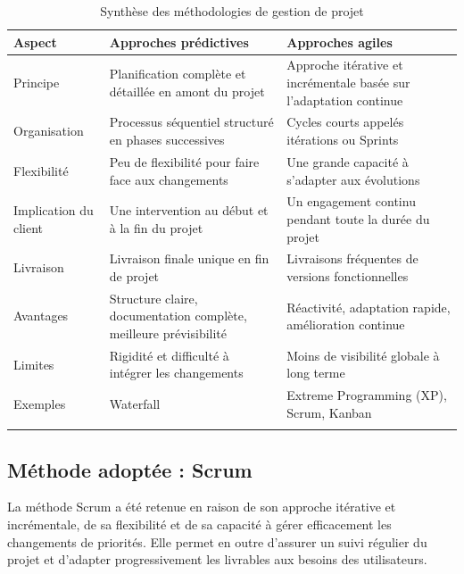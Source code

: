 \setlength{\arrayrulewidth}{0.3pt}
\begin{longtable}{|p{3cm}|p{5.5cm}|p{5.5cm}|}
\hline
\rowcolor{gray!30}
\textbf{Aspect} & \textbf{Approches prédictives} & \textbf{Approches agiles} \\ \hline
\endfirsthead

 

Principe &
Planification complète et détaillée en amont du projet &
Approche itérative et incrémentale basée sur l’adaptation continue \\ \hline

Organisation &
Processus séquentiel structuré en phases successives &
Cycles courts appelés itérations ou Sprints \\ \hline

Flexibilité &
Peu de flexibilité pour faire face aux changements &
Une grande capacité à s'adapter aux évolutions \\ \hline

Implication du client &
Une intervention au début et à la fin du projet &
Un engagement continu pendant toute la durée du projet \\ \hline

Livraison &
Livraison finale unique en fin de projet &
Livraisons fréquentes de versions fonctionnelles \\ \hline

Avantages &
Structure claire, documentation complète, meilleure prévisibilité &
Réactivité, adaptation rapide, amélioration continue \\ \hline

Limites &
Rigidité et difficulté à intégrer les changements &
Moins de visibilité globale à long terme \\ \hline

Exemples &
Waterfall &
Extreme Programming (XP), Scrum, Kanban  \\ \hline
\rowcolor{white}
\caption{Synthèse des méthodologies de gestion de projet}
\label{tab:synthese-methodologies}
\end{longtable}






\subsection{Méthode adoptée : Scrum}

La méthode Scrum a été retenue en raison de son approche itérative et incrémentale, de sa flexibilité et de sa capacité à gérer efficacement les changements de priorités. Elle permet en outre d’assurer un suivi régulier du projet et d’adapter progressivement les livrables aux besoins des utilisateurs.

